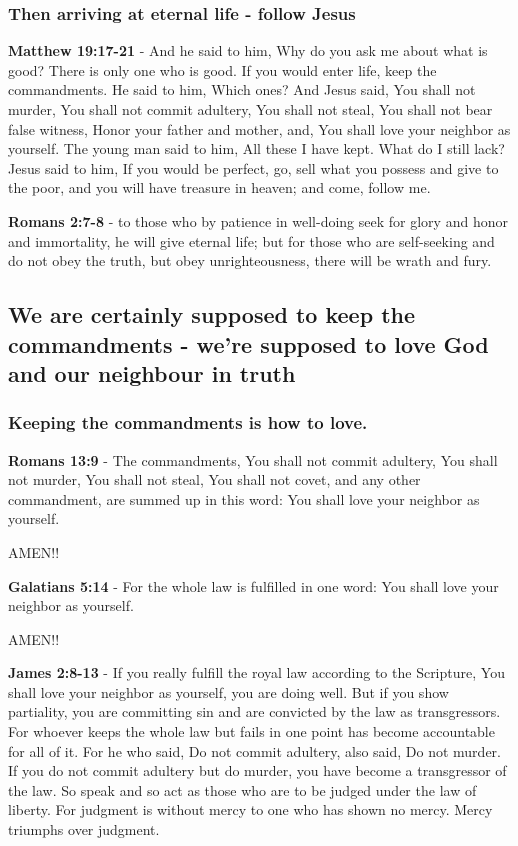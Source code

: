 \documentclass[11pt]{article}
\begin{document}
\subsubsection{Then arriving at eternal life - follow Jesus}
\label{sec:org5f1a7ce}
\textbf{Matthew 19:17-21} - And he said to him, Why do you ask me about what is good? There is only one who is good. If you would enter life, keep the commandments. He said to him, Which ones? And Jesus said, You shall not murder, You shall not commit adultery, You shall not steal, You shall not bear false witness, Honor your father and mother, and, You shall love your neighbor as yourself. The young man said to him, All these I have kept. What do I still lack? Jesus said to him, If you would be perfect, go, sell what you possess and give to the poor, and you will have treasure in heaven; and come, follow me.

\textbf{Romans 2:7-8} - to those who by patience in well-doing seek for glory and honor and immortality, he will give eternal life; but for those who are self-seeking and do not obey the truth, but obey unrighteousness, there will be wrath and fury.

\subsection{We are certainly supposed to keep the commandments - we're supposed to love God and our neighbour in truth}
\label{sec:orgadb3ae1}
\subsubsection{Keeping the commandments is how to love.}
\label{sec:org14e80ec}

\textbf{Romans 13:9} - The commandments, You shall not commit adultery, You shall not murder, You shall not steal, You shall not covet, and any other commandment, are summed up in this word: You shall love your neighbor as yourself.

AMEN!!

\textbf{Galatians 5:14} - For the whole law is fulfilled in one word: You shall love your neighbor as yourself.

AMEN!!

\textbf{James 2:8-13} - If you really fulfill the royal law according to the Scripture, You shall love your neighbor as yourself, you are doing well. But if you show partiality, you are committing sin and are convicted by the law as transgressors. For whoever keeps the whole law but fails in one point has become accountable for all of it. For he who said, Do not commit adultery, also said, Do not murder. If you do not commit adultery but do murder, you have become a transgressor of the law. So speak and so act as those who are to be judged under the law of liberty. For judgment is without mercy to one who has shown no mercy. Mercy triumphs over judgment.
\end{document}
